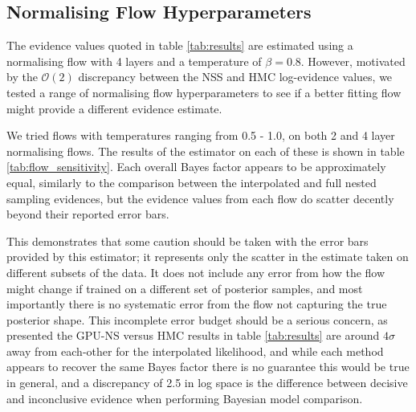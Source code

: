\documentclass[twocolumn]{openjournal}
\begin{document}

\subsection{Normalising Flow Hyperparameters}\label{flowscatter}
The evidence values quoted in table \ref{tab:results} are estimated using a normalising flow with 4 layers and a temperature of $\beta = 0.8$. However, motivated by the $\mathcal{O}(2)$ discrepancy between the NSS and HMC log-evidence values, we tested a range of normalising flow hyperparameters to see if a better fitting flow might provide a different evidence estimate.

We tried flows with temperatures ranging from 0.5 - 1.0, on both 2 and 4 layer normalising flows. The results of the estimator on each of these is shown in table \ref{tab:flow_sensitivity}. Each overall Bayes factor appears to be approximately equal, similarly to the comparison between the interpolated and full nested sampling evidences, but the evidence values from each flow do scatter decently beyond their reported error bars.

This demonstrates that some caution should be taken with the error bars provided by this estimator; it represents only the scatter in the estimate taken on different subsets of the data. It does not include any error from how the flow might change if trained on a different set of posterior samples, and most importantly there is no systematic error from the flow not capturing the true posterior shape. This incomplete error budget should be a serious concern, as presented the GPU-NS versus HMC results in table \ref{tab:results} are around $4\sigma$ away from each-other for the interpolated likelihood, and while each method appears to recover the same Bayes factor there is no guarantee this would be true in general, and a discrepancy of 2.5 in log space is the difference between decisive and inconclusive evidence when performing Bayesian model comparison.

\end{document}
